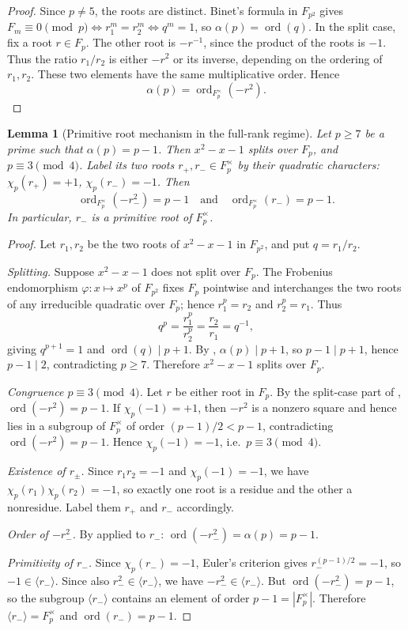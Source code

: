 \documentclass[preprint,5p,times,twocolumn]{elsarticle}
\def\F{F}\def\Z{Z}\def\Q{Q}\def\R{R}\def\N{N}%
\newtheorem{lemma}[theorem]{Lemma}
\DeclareMathOperator{\ord}{ord}
\newcommand{\Z}{\mathbb{Z}}
\newcommand{\Q}{\mathbb{Q}}
\newcommand{\R}{\mathbb{R}}
\newcommand{\F}{\mathbb{F}}
\newcommand{\N}{\mathbb{N}}
\begin{document}
\begin{proof}
Since $p\ne5$, the roots are distinct. Binet's formula in 
$\F_{p^2}$ gives $F_m\equiv0\pmod p \iff r_1^m=r_2^m \iff q^m=1$, 
so $\alpha(p)=\ord(q)$. In the split case, fix a root \(r\in\F_p\). The other root is \(-r^{-1}\), since the product of the roots is \(-1\). Thus the
ratio \(r_1/r_2\) is either \(-r^2\) or its inverse, depending on
the ordering of \(r_1,r_2\). These two elements have the same
multiplicative order. Hence
\[
\alpha(p)=\ord_{\F_p^\times}(-r^2).
\]
\end{proof}

\begin{lemma}[Primitive root mechanism in the full-rank regime]
\label{lem:G}
Let $p\ge 7$ be a prime such that $\alpha(p)=p-1$. Then
$x^2-x-1$ splits over $\F_p$, and $p\equiv 3\pmod 4$. Label its two
roots $r_+,r_-\in\F_p^\times$ by their quadratic characters:
$\chi_p(r_+)=+1$, $\chi_p(r_-)=-1$.
Then
\[
\ord_{\F_p^\times}(-r_-^2)=p-1
\quad\text{and}\quad
\ord_{\F_p^\times}(r_-)=p-1.
\]
In particular, $r_-$ is a primitive root of $\F_p^\times$.
\end{lemma}

\begin{proof}
Let \(r_1,r_2\) be the two roots of \(x^2-x-1\) in \(\F_{p^2}\),
and put \(q=r_1/r_2\).

\emph{Splitting.} Suppose $x^2-x-1$ does not split over $\F_p$. 
The Frobenius endomorphism $\varphi\colon x\mapsto x^p$ of 
$\F_{p^2}$ fixes $\F_p$ pointwise and interchanges the two 
roots of any irreducible quadratic over $\F_p$; hence 
$r_1^p=r_2$ and $r_2^p=r_1$. Thus
\[
q^p=\frac{r_1^p}{r_2^p}=\frac{r_2}{r_1}=q^{-1},
\]
giving $q^{p+1}=1$ and $\ord(q)\mid p+1$. By 
, $\alpha(p)\mid p+1$, so $p-1\mid p+1$, 
hence $p-1\mid 2$, contradicting $p\ge7$. Therefore $x^2-x-1$ 
splits over $\F_p$.

\emph{Congruence $p\equiv3\pmod4$.} Let $r$ be either root in 
$\F_p$. By the split-case part of ,
$\ord(-r^2)=p-1$. If $\chi_p(-1)=+1$, then $-r^2$ is a nonzero 
square and hence lies in a subgroup of $\F_p^\times$ of order 
$(p-1)/2<p-1$, contradicting $\ord(-r^2)=p-1$. Hence 
$\chi_p(-1)=-1$, i.e.\ $p\equiv3\pmod4$.

\emph{Existence of $r_\pm$.} Since $r_1r_2=-1$ and 
$\chi_p(-1)=-1$, we have $\chi_p(r_1)\chi_p(r_2)=-1$, so exactly 
one root is a residue and the other a nonresidue. Label them 
$r_+$ and $r_-$ accordingly.

\emph{Order of $-r_-^2$.} By  applied to 
$r_-$: $\ord(-r_-^2)=\alpha(p)=p-1$.

\emph{Primitivity of $r_-$.} Since $\chi_p(r_-)=-1$, Euler's 
criterion gives $r_-^{(p-1)/2}=-1$, so $-1\in\langle r_-\rangle$. 
Since also $r_-^2\in\langle r_-\rangle$, we have 
$-r_-^2\in\langle r_-\rangle$. But $\ord(-r_-^2)=p-1$, so the 
subgroup $\langle r_-\rangle$ contains an element of order 
$p-1=|\F_p^\times|$. Therefore $\langle r_-\rangle=\F_p^\times$ 
and $\ord(r_-)=p-1$.
\end{proof}
\end{document}
